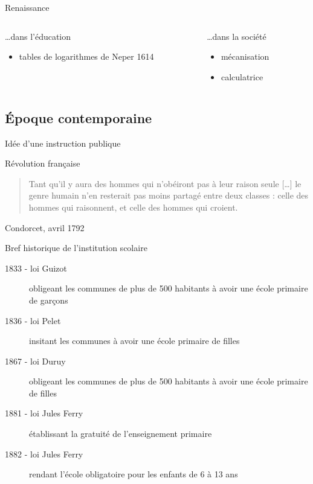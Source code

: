 \begin{frame}{Renaissance}
\begin{columns}
\begin{column}{0.49\linewidth}
\ldots dans l'éducation
\begin{itemize}
\item tables de logarithmes de Neper 1614
\end{itemize}
\end{column}

\begin{column}{0.49\linewidth}
\ldots dans la société
\begin{itemize}
\item mécanisation
\item calculatrice
\end{itemize}
\end{column}
\end{columns}
\end{frame}

\subsection{Époque contemporaine}

\begin{frame}{Idée d'une instruction publique}

Révolution française

\begin{quote}
Tant qu'il y aura des hommes qui n'obéiront pas à leur raison seule [\ldots] le genre humain n'en resterait pas moins partagé entre deux classes : celle des hommes qui raisonnent, et celle 
des hommes qui croient.
\end{quote}
Condorcet, avril 1792

\end{frame}

\begin{frame}{Bref historique de l'institution scolaire}
\begin{description}
\item[1833 - loi Guizot] obligeant les communes de plus de 500 habitants à avoir une école primaire de garçons
\item[1836 - loi Pelet] insitant les communes à avoir une école primaire de filles
\item[1867 - loi Duruy] obligeant les communes de plus de 500 habitants à avoir une école primaire de filles
\item[1881 - loi Jules Ferry] établissant la gratuité de l'enseignement primaire
\item[1882 - loi Jules Ferry] rendant l'école obligatoire pour les enfants de 6 à 13 ans
\end{description}

\end{frame}

